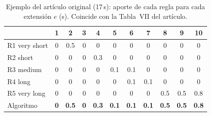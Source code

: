 \begin{table}[!t]
\caption{Ejemplo del artículo original (17\,s): aporte de cada regla para cada extensión $e$ (s). Coincide con la Tabla~VII del artículo.}
\label{tab:tabla7}
\centering
\scriptsize
\setlength{\tabcolsep}{2.2pt}
\begin{tabular}{@{}l*{10}{c}@{}}
\toprule
 & 1 & 2 & 3 & 4 & 5 & 6 & 7 & 8 & 9 & 10 \\
\midrule
R1 very short & 0 & 0.5 & 0 & 0 & 0 & 0 & 0 & 0 & 0 & 0 \\
R2 short & 0 & 0 & 0 & 0.3 & 0 & 0 & 0 & 0 & 0 & 0 \\
R3 medium & 0 & 0 & 0 & 0 & 0.1 & 0.1 & 0 & 0 & 0 & 0 \\
R4 long & 0 & 0 & 0 & 0 & 0 & 0.1 & 0.1 & 0 & 0 & 0 \\
R5 very long & 0 & 0 & 0 & 0 & 0 & 0 & 0 & 0.5 & 0.5 & 0.8 \\
\midrule
Algoritmo & \textbf{0} & \textbf{0.5} & \textbf{0} & \textbf{0.3} & \textbf{0.1} & \textbf{0.1} & \textbf{0.1} & \textbf{0.5} & \textbf{0.5} & \textbf{0.8} \\
\bottomrule
\end{tabular}
\end{table}
